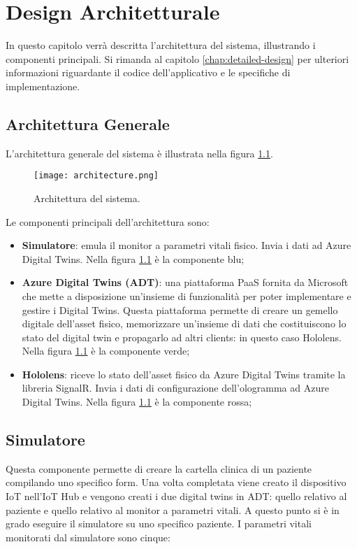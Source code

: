 \chapter{Design Architetturale}
In questo capitolo verrà descritta l'architettura del sistema, illustrando i componenti principali. Si rimanda al capitolo \ref{chap:detailed-design} per ulteriori informazioni riguardante il codice dell'applicativo e le specifiche di implementazione.

\section{Architettura Generale}
L'architettura generale del sistema è illustrata nella figura \ref{pic:architecture}.

\begin{figure}[ht]
    \texttt{[image: architecture.png]}
    \centering
    \caption{\label{pic:architecture}Architettura del sistema.}
\end{figure}

Le componenti principali dell'architettura sono:

\begin{itemize}
    \item \textbf{Simulatore}: emula il monitor a parametri vitali fisico. Invia i dati ad Azure Digital Twins. Nella figura \ref{pic:architecture} è la componente blu;
    
    \item \textbf{Azure Digital Twins (ADT)}: una piattaforma PaaS fornita da Microsoft che mette a disposizione un'insieme di funzionalità per poter implementare e gestire i Digital Twins. Questa piattaforma permette di creare un gemello digitale dell'asset fisico, memorizzare un'insieme di dati che costituiscono lo stato del digital twin e propagarlo ad altri clients: in questo caso Hololens. Nella figura \ref{pic:architecture} è la componente verde;
    
    \item \textbf{Hololens}: riceve lo stato dell'asset fisico da Azure Digital Twins tramite la libreria SignalR. Invia i dati di configurazione dell'ologramma ad Azure Digital Twins. Nella figura \ref{pic:architecture} è la componente rossa;  
\end{itemize}

\section{Simulatore}
Questa componente permette di creare la cartella clinica di un paziente compilando uno specifico form. Una volta completata viene creato il dispositivo IoT nell'IoT Hub e vengono creati i due digital twins in ADT: quello relativo al paziente e quello relativo al monitor a parametri vitali. A questo punto si è in grado eseguire il simulatore su uno specifico paziente. I parametri vitali monitorati dal simulatore sono cinque:

